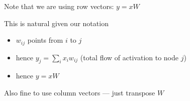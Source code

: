 \documentclass[xcolor=dvipsnames, 10pt]{beamer}
\begin{document}
\begin{frame}
    
    Note that we are using row vectors:  $y = x W$

        \vspace{0.5em}
        \vspace{0.5em}
    This is natural given our notation 

    \begin{itemize}
        \item $w_{ij}$ points from $i$ to $j$
        \vspace{0.5em}
        \item hence $y_j = \sum_i x_i w_{ij} $  (total flow of activation to node $j$)
        \vspace{0.5em}
        \item hence $y = x W$
    \end{itemize}

        \vspace{0.5em}
        \vspace{0.5em}
        \vspace{0.5em}
    Also fine to use column vectors --- just transpose $W$

\end{frame}
\end{document}

